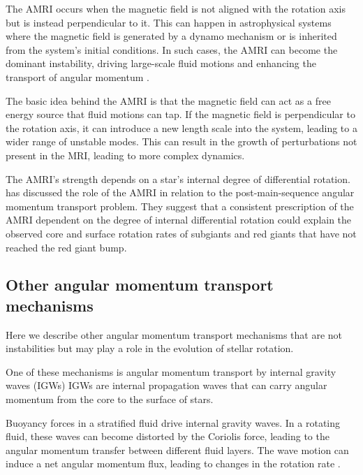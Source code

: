 The AMRI occurs when the magnetic field is not aligned with the rotation axis but is instead perpendicular to it. 
This can happen in astrophysical systems where the magnetic field is generated by a dynamo mechanism or is inherited from the system's initial conditions.
In such cases, the AMRI can become the dominant instability, driving large-scale fluid motions and enhancing the transport of angular momentum \citep{mishra_convective_2021,moyano_asteroseismology_2022}.

The basic idea behind the AMRI is that the magnetic field can act as a free energy source that fluid motions can tap. 
If the magnetic field is perpendicular to the rotation axis, it can introduce a new length scale into the system, leading to a wider range of unstable modes. 
This can result in the growth of perturbations not present in the MRI, leading to more complex dynamics.

The AMRI's strength depends on a star's internal degree of differential rotation.
\citet{moyano_asteroseismology_2022} has discussed the role of the AMRI in relation to the post-main-sequence angular momentum transport problem.
They suggest that a consistent prescription of the AMRI dependent on the degree of internal differential rotation could explain the observed core and surface rotation rates of subgiants and red giants that have not reached the red giant bump.

\subsection{Other angular momentum transport mechanisms}

Here we describe other angular momentum transport mechanisms that are not instabilities but may play a role in the evolution of stellar rotation.
 
One of these mechanisms is angular momentum transport by internal gravity waves (IGWs) \citep{pantillon_angular_2007, kim_angular_2000,talon_hydrodynamical_2005, charbonnel_deep_2008}
IGWs are internal propagation waves that can carry angular momentum from the core to the surface of stars.

Buoyancy forces in a stratified fluid drive internal gravity waves. 
In a rotating fluid, these waves can become distorted by the Coriolis force, leading to the angular momentum transfer between different fluid layers. The wave motion can induce a net angular momentum flux, leading to changes in the rotation rate \citep{zahn_differential_1975}.

